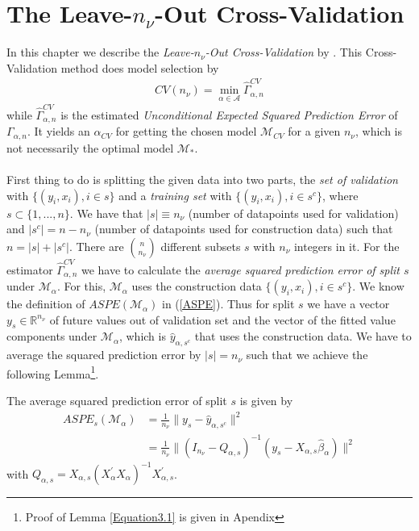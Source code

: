 \documentclass[Research_Module_ES.tex]{subfiles}
\begin{document}
\section{The Leave-$n_\nu$-Out Cross-Validation}
In this chapter we describe the \textit{Leave-$n_\nu$-Out Cross-Validation} by \cite{shao}. This Cross-Validation method does model selection by
\begin{align*}
CV(n_\nu)=\min_{\alpha\in\mathcal{A}}\hat{\Gamma}_{\alpha,n}^{CV}
\end{align*}
while $\hat{\Gamma}_{\alpha,n}^{CV}$ is the estimated \textit{Unconditional Expected Squared Prediction Error} of $\Gamma_{\alpha,n}$. It yields an $\alpha_{CV}$ for getting the chosen model $\mathcal{M}_{CV}$ for a given $n_\nu$, which is not necessarily the optimal model $\mathcal{M}_\ast$.\\\\
First thing to do is splitting the given data into two parts, the \textit{set of validation} with $\{(y_i,x_i), i\in s\}$ and a \textit{training set} with $\{(y_i,x_i), i\in s^c\}$, where $s\subset\{1,...,n\}$. We have that $|s|\equiv n_\nu$ (number of datapoints used for validation) and $|s^c|=n-n_\nu$ (number of datapoints used for
construction data) such that $n=|s|+|s^c|$. There are 
$\binom{n}{n_\nu}$ different subsets $s$ with $n_\nu$ integers in it. For the estimator $\hat{\Gamma}_{\alpha,n}^{CV}$ we have to calculate the \textit{average squared prediction error of split $s$} under $\mathcal{M}_\alpha$. For this,   $\mathcal{M}_\alpha$ uses the construction data $\{(y_i,x_i), i\in s^c\}$. We know the definition of $ASPE(\mathcal{M}_\alpha)$ in (\ref{ASPE}). Thus for split $s$ we have a vector $y_s\in\mathbb{R}^{n_\nu}$ of future values out of validation set and the vector of the fitted value components under $\mathcal{M}_\alpha$, which is $\hat{y}_{\alpha,s^c}$ that uses the construction data. We have to average the squared prediction error by $|s|=n_\nu$ such that we achieve the following Lemma\footnote{Proof of Lemma \ref{Equation3.1} is given in Apendix }.
\begin{lemma}
	\label{Equation3.1}
	The average squared prediction error of split $s$ is given by
	\begin{align*}
		ASPE_{s}(\mathcal{M}_\alpha)&=\frac{1}{n_\nu}\parallel y_s-\hat{y}_{\alpha,s^c}\parallel^2\\
		&=\frac{1}{n_\nu}\parallel (I_{n_\nu}-Q_{\alpha,s})^{-1}(y_s-X_{\alpha,s}\hat{\beta}_\alpha)\parallel^2
	\end{align*}
	with $Q_{\alpha,s}=X_{\alpha,s}(X_\alpha^\prime X_\alpha)^{-1}X_{\alpha,s}^\prime$.
\end{lemma}
\end{document}
